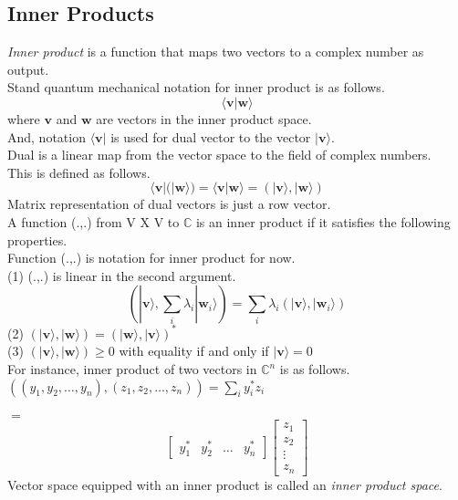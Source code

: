 \documentclass{article}
\begin{document}
\subsection{Inner Products}
\textit{Inner product} is a function that maps two vectors to a complex number as output. \\
Stand quantum mechanical notation for inner product is as follows. \\
\begin{equation}
    \langle\mathbf{v}|\mathbf{w}\rangle
\end{equation} 
where $\mathbf{v}$ and $\mathbf{w}$ are vectors in the inner product space. \\
And, notation $\langle\mathbf{v}|$ is used for dual vector to the vector $|\mathbf{v}\rangle$. \\
Dual is a linear map from the vector space to the field of complex numbers. \\
This is defined as follows. \\
\begin{equation}
    \langle\mathbf{v}|(|\mathbf{w}\rangle) = \langle\mathbf{v}|\mathbf{w}\rangle = (|\mathbf{v}\rangle, |\mathbf{w}\rangle)
\end{equation}
Matrix representation of dual vectors is just a row vector. \\
A function (.,.) from V X V to $\mathbb{C}$ is an inner product if it satisfies the following properties. \\
Function (.,.) is notation for inner product for now. \\
(1) (.,.) is linear in the second argument. \\
    \begin{equation}
        (|\mathbf{v}\rangle, \sum_i \lambda_i |\mathbf{w}_i\rangle) = \sum_i \lambda_i (|\mathbf{v}\rangle, |\mathbf{w}_i\rangle)
    \end{equation}
(2) $(|\mathbf{v}\rangle, |\mathbf{w}\rangle) = (|\mathbf{w}\rangle, |\mathbf{v}\rangle)^*$ \\
(3) $(|\mathbf{v}\rangle, |\mathbf{w}\rangle) \geq 0$ with equality if and only if $|\mathbf{v}\rangle = 0$ \\

For instance, inner product of two vectors in $\mathbb{C}^n$ is as follows. \\
$((y_1, y_2, \ldots, y_n), (z_1, z_2, \ldots, z_n)) = \sum_{i} y_i^* z_i$ \\ \\
$=$
\begin{equation}
    \begin{bmatrix}
        y_1^* & y_2^* & \ldots & y_n^*
    \end{bmatrix}
    \begin{bmatrix}
        z_1 \\
        z_2 \\
        \vdots \\
        z_n
    \end{bmatrix}
\end{equation}
Vector space equipped with an inner product is called an \textit{inner product space}. \\
\end{document}
